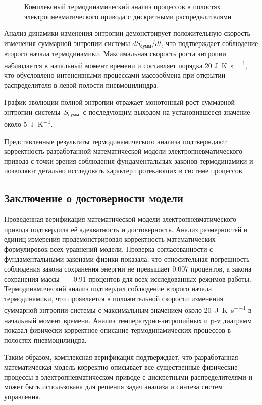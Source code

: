 \begin{figure}[ht]
    \caption{Комплексный термодинамический анализ процессов в полостях электропневматического привода с дискретными распределителями}
    \label{fig:ch2/thermodynamics_analysis}

\end{figure}

Анализ динамики изменения энтропии
демонстрирует положительную скорость изменения суммарной 
энтропии системы $dS_{сумм}/dt$, что подтверждает соблюдение второго начала термодинамики.
Максимальная скорость роста энтропии наблюдается в начальный момент времени и составляет порядка 
20 \si{\joule\per\kelvin\per\second}, что обусловлено интенсивными процессами массообмена при открытии распределителя
в левой полости пневмоцилиндра.

График эволюции полной энтропии отражает монотонный рост суммарной энтропии системы~$S_{сумм}$~с последующим 
выходом на установившееся значение около 5~\si{\joule\per\kelvin}. 

Представленные результаты термодинамического анализа подтверждают корректность
разработанной математической модели электропневматического привода с точки зрения соблюдения 
фундаментальных законов термодинамики и позволяют детально исследовать характер протекающих в системе процессов.

\subsection{Заключение о достоверности модели}\label{sec:ch2/sec6/subsec5}

Проведенная верификация математической модели электропневматического привода подтвердила её адекватность и достоверность.
Анализ размерностей и единиц измерения продемонстрировал корректность математических формулировок всех уравнений модели.
Проверка согласованности с фундаментальными законами физики показала, что относительная погрешность соблюдения
закона сохранения энергии не превышает \num{0.007} процентов, а закона сохранения массы~---~\num{0.91} процентов
для всех исследованных режимов работы.
Термодинамический анализ подтвердил соблюдение второго начала термодинамики,
что проявляется в положительной скорости изменения суммарной энтропии системы с максимальным значением
около \SI{20}{\joule\per\kelvin\per\second} в начальный момент времени. Анализ температурно-энтропийных
и p-v диаграмм показал физически корректное описание термодинамических процессов в полостях пневмоцилиндра.

Таким образом, комплексная верификация подтверждает, что разработанная математическая модель
корректно описывает все существенные физические процессы в электропневматическом приводе с
дискретными распределителями и может быть использована для решения задач анализа и синтеза систем управления.